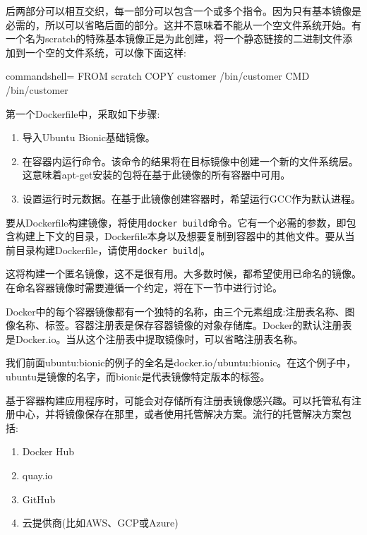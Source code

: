 后两部分可以相互交织，每一部分可以包含一个或多个指令。因为只有基本镜像是必需的，所以可以省略后面的部分。这并不意味着不能从一个空文件系统开始。有一个名为scratch的特殊基本镜像正是为此创建，将一个静态链接的二进制文件添加到一个空的文件系统，可以像下面这样:

\begin{tcblisting}{commandshell={}}
FROM scratch
COPY customer /bin/customer
CMD /bin/customer
\end{tcblisting}

第一个Dockerfile中，采取如下步骤:

\begin{enumerate}
\item 
导入Ubuntu Bionic基础镜像。

\item
在容器内运行命令。该命令的结果将在目标镜像中创建一个新的文件系统层。这意味着apt-get安装的包将在基于此镜像的所有容器中可用。

\item
设置运行时元数据。在基于此镜像创建容器时，希望运行GCC作为默认进程。
\end{enumerate}

要从Dockerfile构建镜像，将使用\texttt{docker build}命令。它有一个必需的参数，即包含构建上下文的目录，Dockerfile本身以及想要复制到容器中的其他文件。要从当前目录构建Dockerfile，请使用\texttt{docker build}|。

这将构建一个匿名镜像，这不是很有用。大多数时候，都希望使用已命名的镜像。在命名容器镜像时需要遵循一个约定，将在下一节中进行讨论。


Docker中的每个容器镜像都有一个独特的名称，由三个元素组成:注册表名称、图像名称、标签。容器注册表是保存容器镜像的对象存储库。Docker的默认注册表是Docker.io。当从这个注册表中提取镜像时，可以省略注册表名称。

我们前面ubuntu:bionic的例子的全名是docker.io/ubuntu:bionic。在这个例子中，ubuntu是镜像的名字，而bionic是代表镜像特定版本的标签。

基于容器构建应用程序时，可能会对存储所有注册表镜像感兴趣。可以托管私有注册中心，并将镜像保存在那里，或者使用托管解决方案。流行的托管解决方案包括:

\begin{enumerate}
\item 
Docker Hub

\item 
quay.io

\item 
GitHub

\item 
云提供商(比如AWS、GCP或Azure)
\end{enumerate}

